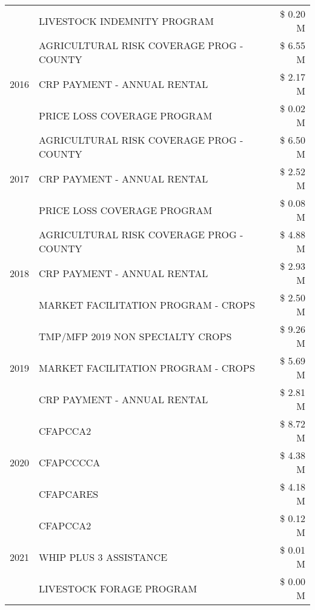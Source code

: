 \begin{tabular}{llr}
 & LIVESTOCK INDEMNITY PROGRAM & \$ 0.20 M \\
\cline{1-3}
\multirow[t]{3}{*}{2016} & AGRICULTURAL RISK COVERAGE PROG - COUNTY & \$ 6.55 M \\
 & CRP PAYMENT - ANNUAL RENTAL & \$ 2.17 M \\
 & PRICE LOSS COVERAGE PROGRAM & \$ 0.02 M \\
\cline{1-3}
\multirow[t]{3}{*}{2017} & AGRICULTURAL RISK COVERAGE PROG - COUNTY & \$ 6.50 M \\
 & CRP PAYMENT - ANNUAL RENTAL & \$ 2.52 M \\
 & PRICE LOSS COVERAGE PROGRAM & \$ 0.08 M \\
\cline{1-3}
\multirow[t]{3}{*}{2018} & AGRICULTURAL RISK COVERAGE PROG - COUNTY & \$ 4.88 M \\
 & CRP PAYMENT - ANNUAL RENTAL & \$ 2.93 M \\
 & MARKET FACILITATION PROGRAM - CROPS & \$ 2.50 M \\
\cline{1-3}
\multirow[t]{3}{*}{2019} & TMP/MFP 2019 NON SPECIALTY CROPS & \$ 9.26 M \\
 & MARKET FACILITATION PROGRAM - CROPS & \$ 5.69 M \\
 & CRP PAYMENT - ANNUAL RENTAL & \$ 2.81 M \\
\cline{1-3}
\multirow[t]{3}{*}{2020} & CFAPCCA2 & \$ 8.72 M \\
 & CFAPCCCCA & \$ 4.38 M \\
 & CFAPCARES & \$ 4.18 M \\
\cline{1-3}
\multirow[t]{3}{*}{2021} & CFAPCCA2 & \$ 0.12 M \\
 & WHIP PLUS 3 ASSISTANCE & \$ 0.01 M \\
 & LIVESTOCK FORAGE PROGRAM & \$ 0.00 M \\
\cline{1-3}
\bottomrule
\end{tabular}
